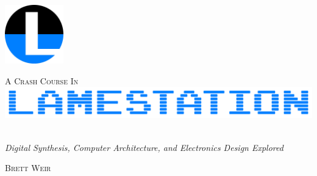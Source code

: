 \begin{titlepage}
    \begin{flushright}

        \includegraphics[width=1in]{graphics/lamestation-seal-800px.png}

        \vspace*{0.3\textheight}

        \textsc{\LARGE A Crash Course In}
        {\color{gray}{\rule{\textwidth}{1pt}}}
        \includegraphics[width=\textwidth]{graphics/ls-logo-blue_1600.png}~\\[-0.4cm]
        {\color{gray}{\rule{\textwidth}{1pt}}}

        \textit{Digital Synthesis, Computer Architecture, and Electronics Design Explored}

        \vfill
        \textsc{\Large Brett Weir}


    \end{flushright}
\end{titlepage}

